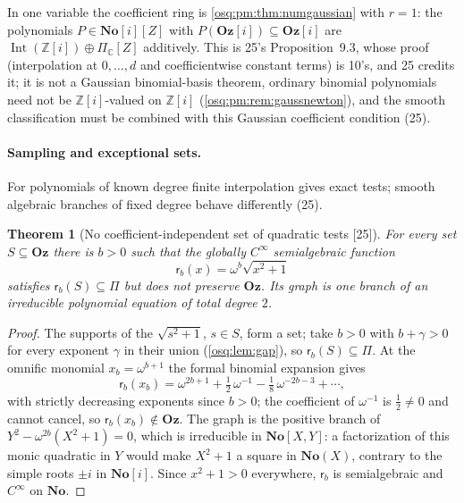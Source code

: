 \documentclass[11pt,letterpaper]{article}
\numberwithin{equation}{section}
\newtheorem{theorem}{Theorem}[section]
\theoremstyle{definition}
\theoremstyle{remark}
\theoremstyle{plain}
\newcommand{\No}{\mathbf{No}}
\newcommand{\Oz}{\mathbf{Oz}}
\newcommand{\SC}{\No[i]}
\newcommand{\GOz}{\Oz[i]}
\newcommand{\Z}{\mathbb Z}
\newcommand{\C}{\mathbb C}
\newcommand{\Int}{\operatorname{Int}}
\newcommand{\src}[1]{\textup{\textsf{[#1]}}}
\begin{document}
In one variable the coefficient ring is \cref{osq:pm:thm:numgaussian} with $r=1$: the polynomials $P\in\SC[Z]$ with $P(\GOz)\subseteq\GOz$ are
$\Int(\Z[i])\oplus\Pi_\C[Z]$ additively. This is 25's Proposition~9.3, whose proof (interpolation at $0,\dots,d$ and coefficientwise constant terms) is
10's, and 25 credits it; it is not a Gaussian binomial-basis theorem, ordinary binomial polynomials need not be $\Z[i]$-valued on $\Z[i]$
(\cref{osq:pm:rem:gaussnewton}), and the smooth classification must be combined with this Gaussian coefficient condition (25).

\paragraph{Sampling and exceptional sets.} For polynomials of known degree finite interpolation gives exact tests; smooth algebraic branches of fixed
degree behave differently (25).

\begin{theorem}[No coefficient-independent set of quadratic tests \src{25}]\label{osq:sa:thm:nosettests}
For every set $S\subseteq\Oz$ there is $b>0$ such that the globally $C^\infty$ semialgebraic function
\begin{equation}\label{osq:sa:eq:testfunction}
 \mathsf r_b(x)=\omega^b\sqrt{x^2+1}
\end{equation}
satisfies $\mathsf r_b(S)\subseteq\Pi$ but does not preserve $\Oz$. Its graph is one branch of an irreducible polynomial equation of total degree $2$.
\end{theorem}
\begin{proof}
The supports of the $\sqrt{s^2+1}$, $s\in S$, form a set; take $b>0$ with $b+\gamma>0$ for every exponent $\gamma$ in their union (\cref{osq:lem:gap}), so
$\mathsf r_b(S)\subseteq\Pi$. At the omnific monomial $x_b=\omega^{b+1}$ the formal binomial expansion gives
\begin{equation}\label{osq:sa:eq:testfailure}
 \mathsf r_b(x_b)=\omega^{2b+1}+\tfrac12\,\omega^{-1}-\tfrac18\,\omega^{-2b-3}+\cdots,
\end{equation}
with strictly decreasing exponents since $b>0$; the coefficient of $\omega^{-1}$ is $\frac12\ne0$ and cannot cancel, so $\mathsf r_b(x_b)\notin\Oz$. The
graph is the positive branch of $Y^2-\omega^{2b}(X^2+1)=0$, which is irreducible in $\No[X,Y]$: a factorization of this monic quadratic in $Y$ would make
$X^2+1$ a square in $\No(X)$, contrary to the simple roots $\pm i$ in $\SC$. Since $x^2+1>0$ everywhere, $\mathsf r_b$ is semialgebraic and $C^\infty$ on
$\No$.
\end{proof}
\end{document}
